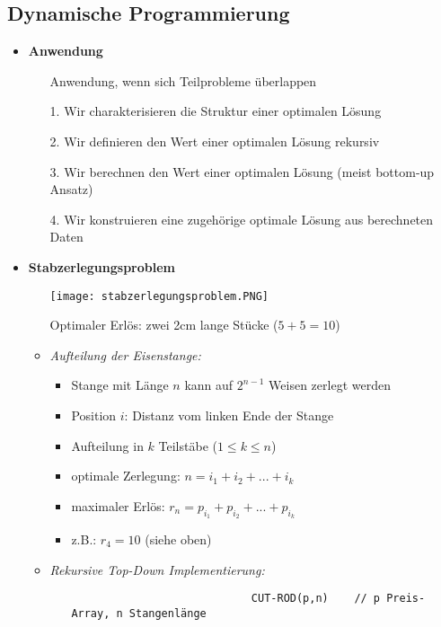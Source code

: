 \subsection{Dynamische Programmierung}
    \begin{itemize}
        \item \textbf{Anwendung}
            \begin{itemize}
                \item[] Anwendung, wenn sich Teilprobleme überlappen
                \item[1.] Wir charakterisieren die Struktur einer optimalen Lösung
                \item[2.] Wir definieren den Wert einer optimalen Lösung rekursiv
                \item[3.] Wir berechnen den Wert einer optimalen Lösung (meist bottom-up Ansatz)
                \item[4.] Wir konstruieren eine zugehörige optimale Lösung aus berechneten Daten   
            \end{itemize}

        \item \textbf{Stabzerlegungsproblem}
            \begin{itemize}
                \item[] \texttt{[image: stabzerlegungsproblem.PNG]}
                \item[] Optimaler Erlös: zwei 2cm lange Stücke ($5+5=10$) 
                \item \textit{Aufteilung der Eisenstange:}
                    \begin{itemize}
                        \item Stange mit Länge $n$ kann auf $2^{n-1}$ Weisen zerlegt werden
                        \item Position $i$: Distanz vom linken Ende der Stange
                        \item Aufteilung in $k$ Teilstäbe ($1 \leq k \leq n$)
                        \item optimale Zerlegung: $n = i_1 + i_2 + ... + i_k$
                        \item maximaler Erlös: $r_n = p_{i_1} + p_{i_2} + ... + p_{i_k}$
                        \item z.B.: $r_4 = 10$ (siehe oben)
                    \end{itemize}
                \item \textit{Rekursive Top-Down Implementierung:}
                    \begin{itemize}
                        \item[]
                            \begin{verbatim}
                            CUT-ROD(p,n)    // p Preis-Array, n Stangenlänge


\end{verbatim}
\end{itemize}
\end{itemize}
\end{itemize}
